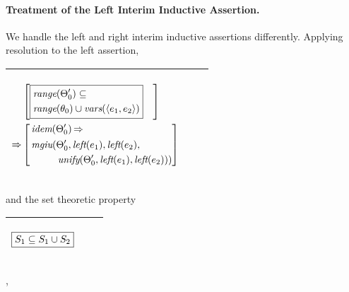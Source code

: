 \documentclass[runningheads]{llncs}
\DeclareMathOperator{\uimplies}{\Rightarrow}
\DeclareMathOperator{\unify}{\emph{unify}}
\DeclareMathOperator{\lef}{\emph{left}}
\DeclareMathOperator{\idem}{\emph{idem}}
\DeclareMathOperator{\mgiu}{\emph{mgiu}}
\begin{document}
\paragraph{Treatment of the Left Interim Inductive Assertion.} We  handle the left and right interim inductive assertions differently.  Applying resolution to the left assertion, 
  \begin{center}
  \begin{tabular}{|m{}|m{}||m{}|}
\hline
\begin{center}
{$\begin{aligned}
 &\begin{aligned}
&\begin{aligned}
&\left[\begin{aligned}
 &\boxed{\begin{aligned}
 &\range(\Thet{0}') \subseteq \\
  &\range(\thet{0})\cup\vars(\langle \e{1}, \e{2} \rangle) 
  \end{aligned}} 
  \end{aligned} \right] 
  \end{aligned} 
\end{aligned} \\
 \uimplies &\left[\begin{aligned}&\idem(\Thet{0}') \uimplies \\
 &\begin{aligned}
    {\,\mgiu}(&\Thet{0}', \lef(\e{1}), \lef(\e{2}), \\
    &\unify(\Thet{0}', \lef(\e{1}), \lef(\e{2}))) 
\end{aligned}
\end{aligned}\right] \end{aligned}  $}  \hspace{1cm} 
\end{center}& &  \\  \hline
\end{tabular}
\end{center}
and the set theoretic property

\vspace{5pt}
\noindent \begin{tabular}{|m{}|m{}||m{}|}
\hline
\begin{center}$
\begin{aligned}
     \boxed{{S}_{1} \subseteq {S}_{1} \cup {S}_{2}}
\end{aligned}
$
\end{center}& &  \\  \hline
\end{tabular},
\vspace{10pt}
\end{document}
